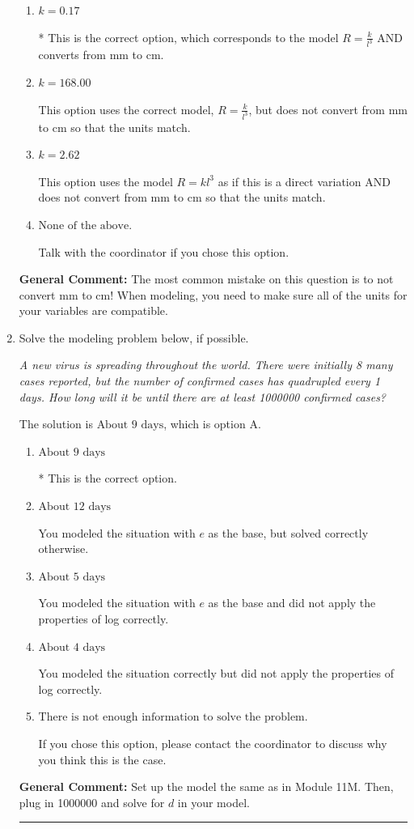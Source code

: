\documentclass{extbook}[14pt]
\newcommand{\litem}[1]{\item #1

\rule{\textwidth}{0.4pt}}
\begin{document}
\begin{enumerate}
{\begin{enumerate}[label=\Alph*.]
This option uses the model $R = kl^{3}$ as if this is a direct variation.
\item \( k = 0.17 \)

* This is the correct option, which corresponds to the model $R = \frac{k}{l^{3}}$ AND converts from mm to cm.
\item \( k = 168.00 \)

This option uses the correct model, $R = \frac{k}{l^{3}}$, but does not convert from mm to cm so that the units match.
\item \( k = 2.62 \)

This option uses the model $R = kl^{3}$ as if this is a direct variation AND does not convert from mm to cm so that the units match.
\item \( \text{None of the above.} \)

Talk with the coordinator if you chose this option.
\end{enumerate}

\textbf{General Comment:} The most common mistake on this question is to not convert mm to cm! When modeling, you need to make sure all of the units for your variables are compatible.
}
\litem{
Solve the modeling problem below, if possible.

\begin{center}
    \textit{ A new virus is spreading throughout the world. There were initially 8 many cases reported, but the number of confirmed cases has quadrupled every 1 days. How long will it be until there are at least 1000000 confirmed cases? }
\end{center}
The solution is \( \text{About } 9 \text{ days} \), which is option A.\begin{enumerate}[label=\Alph*.]
\item \( \text{About } 9 \text{ days} \)

* This is the correct option.
\item \( \text{About } 12 \text{ days} \)

You modeled the situation with $e$ as the base, but solved correctly otherwise.
\item \( \text{About } 5 \text{ days} \)

You modeled the situation with $e$ as the base and did not apply the properties of log correctly.
\item \( \text{About } 4 \text{ days} \)

You modeled the situation correctly but did not apply the properties of log correctly.
\item \( \text{There is not enough information to solve the problem.} \)

If you chose this option, please contact the coordinator to discuss why you think this is the case.
\end{enumerate}

\textbf{General Comment:} Set up the model the same as in Module 11M. Then, plug in 1000000 and solve for $d$ in your model.
}
\end{enumerate}
\end{document}
